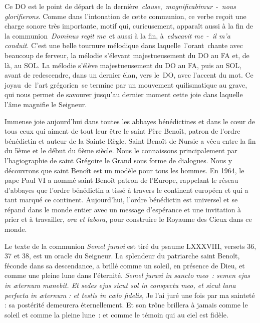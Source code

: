 \documentclass[Session2026.tex]{subfiles}
\begin{document}
Ce DO est le point de départ de la
dernière~\emph{clause},~\emph{magnificabimur}~-~\emph{nous
glorifierons}. Comme dans l'intonation de cette communion, ce verbe
reçoit une charge sonore très importante, motif qui, curieusement,
apparaît aussi à la fin de la communion~\emph{Dominus regit me}~et aussi
à la fin, à~\emph{educavit me}~-~\emph{il m'a conduit}. C'est une belle
tournure mélodique dans laquelle~l'orant~chante avec beaucoup de
ferveur, la mélodie s'élevant majestueusement du DO au FA et, de là, au
SOL. La mélodie s'élève majestueusement du DO au FA, puis au SOL, avant
de redescendre, dans un dernier élan, vers le~DO, avec l'accent du mot.
Ce joyau~de~l'art grégorien~se termine par un mouvement quilismatique au
grave, qui nous permet de savourer jusqu'au dernier moment cette joie
dans laquelle l'âme magnifie le Seigneur.

\newpage


Immense joie aujourd'hui dans toutes les abbayes bénédictines et dans le
cœur de tous ceux qui aiment de tout leur être le saint Père Benoît,
patron de l'ordre bénédictin et auteur de la Sainte Règle. Saint Benoît
de Nursie a vécu entre la fin du 5ème et le début du 6ème siècle. Nous
le connaissons principalement par l'hagiographie de saint Grégoire le
Grand sous forme de dialogues. Nous y découvrons que saint Benoît est un
modèle pour tous les hommes. En 1964, le pape Paul VI a nommé saint
Benoît patron de l'Europe, rappelant le réseau d'abbayes que l'ordre
bénédictin a tissé à travers le continent européen et qui a tant marqué
ce continent. Aujourd'hui, l'ordre bénédictin est universel et se répand
dans le monde entier avec un message d'espérance et une invitation à
prier et à travailler, \emph{ora et labora}, pour construire le Royaume
des Cieux dans ce monde.

Le texte de la communion \emph{Semel juravi} est tiré du psaume
LXXXVIII, versets 36, 37 et 38, est un oracle du Seigneur. La splendeur
du patriarche saint Benoît, féconde dans sa descendance, a brillé comme
un soleil, en présence de Dieu, et comme une pleine lune dans
l'éternité. \emph{Semel juravi in sancto meo~: semen ejus in æternum
manebit. Et sedes ejus sicut sol in conspectu meo, et sicut luna
perfecta in æternum : et testis in cælo fidelis,} Je l'ai juré une fois
par ma sainteté : sa postérité demeurera éternellement. Et son trône
brillera à jamais comme le soleil et comme la pleine lune~: et comme le
témoin qui au ciel est fidèle.
\end{document}
